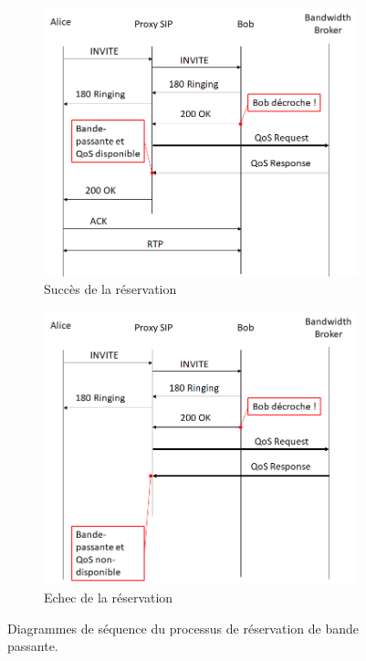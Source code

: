 \documentclass[a4paper,11pt]{article}
\begin{document}
\begin{figure}[htp]
    \centering
    \begin{subfigure}{0.8\textwidth}
        \centering
        \includegraphics[width=\linewidth]{images/reqOK.png}
        \caption{Succès de la réservation}
    \end{subfigure}
    \begin{subfigure}{0.8\textwidth}
        \centering
        \includegraphics[width=\linewidth]{images/reqNOK.png}
        \caption{Echec de la réservation}
    \end{subfigure}
    \caption{Diagrammes de séquence du processus de réservation de bande passante.}
    \label{fig:reqres}
\end{figure}
\end{document}
